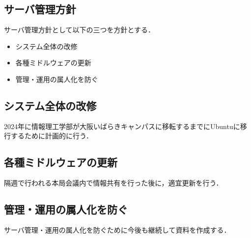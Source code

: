 \subsection*{サーバ管理方針}


サーバ管理方針として以下の三つを方針とする．
\begin{itemize}
    \item システム全体の改修
    \item 各種ミドルウェアの更新
    \item 管理・運用の属人化を防ぐ
\end{itemize}

\subsection*{システム全体の改修}
2024年に情報理工学部が大阪いばらきキャンパスに移転するまでにUbuntuに移行するために計画的に行う．

\subsection*{各種ミドルウェアの更新}
隔週で行われる本局会議内で情報共有を行った後に，適宜更新を行う．

\subsection*{管理・運用の属人化を防ぐ}
サーバ管理・運用の属人化を防ぐために今後も継続して資料を作成する．
